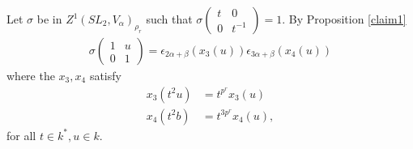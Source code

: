 	Let $\sigma$ be in $Z^1(SL_2, V_\alpha)_{\rho_r}$ such that $\sigma\left(\begin{matrix}t & 0\\0 & t^{-1}\end{matrix}\right) = 1$.
	By Proposition \ref{claim1}
	\begin{align*}
	\sigma\left(\begin{matrix} 1 & u \\ 0 & 1 \end{matrix}\right) =
\epsilon_{2\alpha+\beta}(x_3(u))
\epsilon_{3\alpha+\beta}(x_4(u))
	\end{align*}
	where the $x_3, x_4$ satisfy
	\begin{align}
	x_3(t^2u) &= t^{p^r}x_3(u)\label{eqn:g2x3}\\
							 x_4(t^2b) &= t^{3p^r}x_4(u)\label{eqn:g2x4},
	\end{align}
	for all $t\in k^*, u\in k$.

